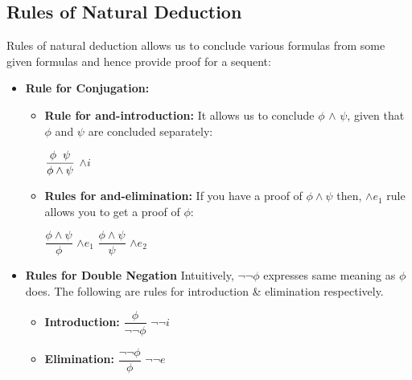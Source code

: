 \documentclass{report}
\begin{document}
    \subsection{Rules of Natural Deduction}
    Rules of natural deduction allows us to conclude various formulas from some given formulas and hence provide proof for a sequent:
    \par
    \begin{itemize}
        \item \textbf{Rule for Conjugation:} 
            \begin{itemize}
                \item {\textbf{Rule for and-introduction:}} It allows us to conclude $\phi$ $\wedge$ $\psi$, given that $\phi$ and $\psi$ are concluded separately:
                \begin{center}
                 $\dfrac{\phi \hspace{0.2cm} \psi}{\phi \wedge \psi}$ $\wedge i$
                \end{center}
             
                \item \textbf{Rules for and-elimination:} If you have a proof of  $\phi \wedge \psi$ then, $\wedge e_1$ rule allows you to get a proof of $\phi$:\\
                \begin{center}
                    $\dfrac{\phi \wedge \psi}{\phi}$   $\wedge e_1$ \hspace{2cm}
                    $\dfrac{\phi \wedge \psi}{\psi}$   $\wedge e_2$
                \end{center}
            \end{itemize}
        
        \item{\textbf{Rules for Double Negation}} Intuitively, $\neg \neg \phi$ expresses same meaning as $\phi$ does. The following are rules for introduction \& elimination respectively.
            \begin{itemize}
               \item \textbf{Introduction: }\hspace{0.2cm} $\dfrac{\phi}{\neg \neg \phi}$\hspace{0.2cm} $\neg \neg i$
               
               \item \textbf{Elimination: } \hspace{0.2cm} $\dfrac{\neg \neg \phi}{\phi}$ \hspace{0.2cm} $\neg \neg e$
            \end{itemize}
    

\end{itemize}
\end{document}
